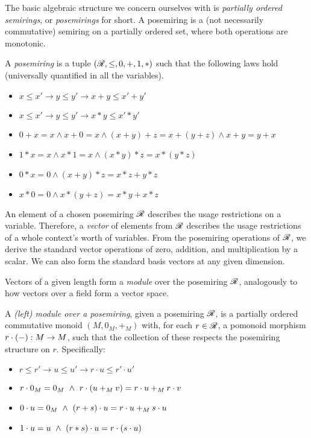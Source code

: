 The basic algebraic structure we concern ourselves with is \emph{partially
ordered semirings}, or \emph{posemirings} for short.
A posemiring is a (not necessarily commutative) semiring on a partially ordered
set, where both operations are monotonic.

\begin{definition}
  A \emph{posemiring} is a tuple $(\mathscr R, \leq, 0, +, 1, *)$ such that the
  following laws hold (universally quantified in all the variables).
  \begin{itemize}
    \item $x \leq x' \to y \leq y' \to x + y \leq x' + y'$
    \item $x \leq x' \to y \leq y' \to x * y \leq x' * y'$
    \item $0 + x = x
      \land x + 0 = x
      \land (x + y) + z = x + (y + z)
      \land x + y = y + x$
    \item $1 * x = x
      \land x * 1 = x
      \land (x * y) * z = x * (y * z)$
    \item $0 * x = 0
      \land (x + y) * z = x * z + y * z$
    \item $x * 0 = 0
      \land x * (y + z) = x * y + x * z$
  \end{itemize}
\end{definition}

An element of a chosen posemiring $\mathscr R$ describes the usage restrictions on
a variable.
Therefore, a \emph{vector} of elements from $\mathscr R$ describes the usage
restrictions of a whole context's worth of variables.
From the posemiring operations of $\mathscr R$, we derive the standard vector
operations of zero, addition, and multiplication by a scalar.
We can also form the standard basis vectors at any given dimension.

Vectors of a given length form a \emph{module} over the posemiring $\mathscr R$,
analogously to how vectors over a field form a vector space.

\begin{definition}
  A \emph{(left) module over a posemiring}, given a posemiring $\mathscr R$, is a
  partially ordered commutative monoid $(M, 0_M, +_M)$ with, for each
  $r \in \mathscr R$, a pomonoid morphism $r \cdot \plr{-} : M \to M$, such that the
  collection of these respects the posemiring structure on $r$.
  Specifically:
  \begin{itemize}
    \item $r \leq r' \to u \leq u' \to r \cdot u \leq r' \cdot u'$
    \item $r \cdot 0_M = 0_M
      \land r \cdot \plr{u +_M v} = r \cdot u +_M r \cdot v$
    \item $0 \cdot u = 0_M
      \land \plr{r + s} \cdot u = r \cdot u +_M s \cdot u$
    \item $1 \cdot u = u
      \land \plr{r * s} \cdot u = r \cdot \plr{s \cdot u}$
  \end{itemize}
\end{definition}

